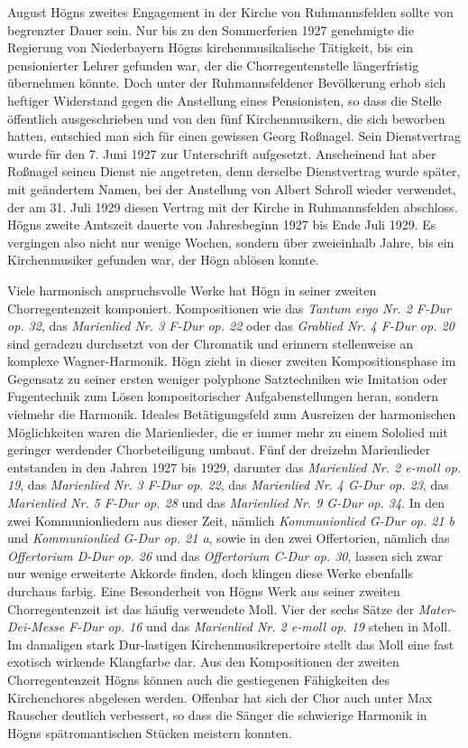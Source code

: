 \documentclass{book}
\begin{document}
August Högns zweites Engagement in der Kirche von Ruhmannsfelden sollte
von begrenzter Dauer sein. Nur bis zu den Sommerferien 1927
geneh\-migte die Regierung von Niederbayern Högns kirchenmusikalische
Tätigkeit, bis ein pensionierter Lehrer gefunden war, der die
Chorregentenstelle länger\-fristig übernehmen könnte. Doch unter der
Ruhmannsfeldener Bevölkerung erhob sich heftiger Widerstand gegen die
Anstellung eines Pensionisten, so dass die Stelle öffentlich
ausgeschrieben und von den fünf Kirchenmusikern, die sich beworben
hatten, entschied man sich für einen gewissen Georg Roßnagel. Sein
Dienstvertrag wurde für den 7. Juni 1927 zur Unterschrift auf\-gesetzt.
Anscheinend hat aber Roßnagel seinen Dienst nie angetreten, denn
derselbe Dienstvertrag wurde später, mit geändertem Namen, bei der
Anstel\-lung von Albert Schroll wieder verwendet, der am 31. Juli 1929
diesen Vertrag mit der Kirche in Ruhmannsfelden abschloss. Högns zweite
Amtszeit dauerte von Jahresbeginn 1927 bis Ende Juli 1929. Es vergingen
also nicht nur wenige Wochen, sondern über zweieinhalb Jahre, bis ein
Kirchenmusiker gefunden war, der Högn ablösen konnte.

Viele harmonisch anspruchsvolle Werke hat Högn in seiner zweiten
Chor\-regentenzeit komponiert. Kompositionen wie das \textit{Tantum
ergo Nr. 2 F-Dur} \textit{op. 32}, das \textit{Marienlied Nr. 3 F-Dur
op. 22} oder das \textit{Grablied Nr. 4 F-Dur op. 20} sind geradezu
durchsetzt von der Chromatik und erinnern stellenweise an komple\-xe
Wagner-Harmonik. Högn zieht in dieser zweiten Kompositionsphase im
Gegensatz zu seiner ersten weniger polyphone Satztechniken wie
Imitation oder Fugentechnik zum Lösen kompositorischer
Aufgabenstellungen heran, sondern vielmehr die Harmonik. Ideales
Betätigungsfeld zum Ausreizen der harmonischen Möglichkeiten waren die
Marienlieder, die er immer mehr zu einem Sololied mit geringer
werdender Chorbeteiligung umbaut. Fünf der dreizehn Marienlieder
entstanden in den Jahren 1927 bis 1929, darunter das \textit{Marienlied
Nr. 2 e-moll op. 19}, das \textit{Marienlied Nr. 3 F-Dur op. 22}, das
\textit{Marienlied Nr. 4 G-Dur op. 23}, das \textit{Marienlied Nr. 5
F-Dur op. 28} und das \textit{Marienlied Nr. 9 G-Dur op. 34}. In den
zwei Kommunionliedern aus dieser Zeit, nämlich
\textit{Kommu\-}\textit{nionlied G-Dur op. 21 b} und
\textit{Kommunionlied G-Dur op. 21 a}, sowie in den zwei Offertorien,
nämlich das \textit{Offertorium D-Dur op. 26} und das
\textit{Offertorium C-Dur op. 30}, lassen sich zwar nur wenige
erweiterte Akkorde finden, doch klingen diese Werke ebenfalls durchaus
farbig. Eine Besonderheit von Högns Werk aus seiner zweiten
Chorregentenzeit ist das häufig verwendete Moll. Vier der sechs Sätze
der \textit{Mater-Dei-Messe F-Dur op. 16} und das \textit{Marienlied
Nr. 2 e-moll op. 19} stehen in Moll. Im damaligen stark Dur-lastigen
Kirchenmusikrepertoire stellt das Moll eine fast exotisch wirkende
Klangfarbe dar. Aus den Kom\-positionen der zweiten Chorregentenzeit
Högns können auch die gestiegenen Fähigkeiten des Kirchenchores
abgelesen werden. Offenbar hat sich der Chor auch unter Max Rauscher
deutlich verbessert, so dass die Sänger die schwie\-rige Harmonik in
Högns spätromantischen Stücken meistern konnten.
\end{document}
